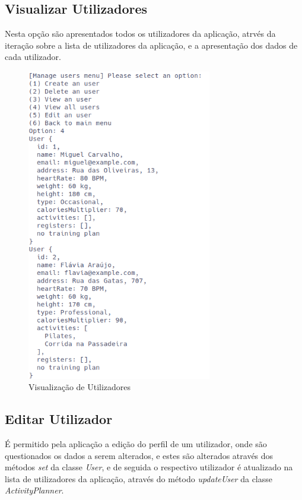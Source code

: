 \documentclass[a4paper,12pt]{scrreprt}
\begin{document}
    \clearpage
    \subsection{Visualizar Utilizadores}
    Nesta opção são apresentados todos os utilizadores da aplicação,
    atrvés da iteração sobre a lista de utilizadores da aplicação,
    e a apresentação dos dados de cada utilizador.

    \begin{figure}[!ht]
        \centering
        \includegraphics[width=0.72\textwidth]{images/viewUsers.png}
        \caption{Visualização de Utilizadores}
        \label{fig:view-users}
    \end{figure}

    \clearpage
    \subsection{Editar Utilizador}
    É permitido pela aplicação a edição do perfil de um utilizador,
    onde são questionados os dados a serem alterados,
    e estes são alterados através dos métodos \textit{set} da classe \textit{User},
    e de seguida o respectivo utilizador é atualizado na lista de utilizadores da aplicação,
    através do método \textit{updateUser} da classe \textit{ActivityPlanner}.
\end{document}
